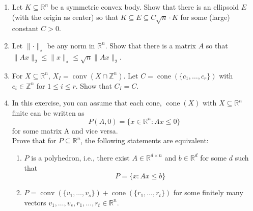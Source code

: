 \documentclass[11pt,a4paper]{article}
\renewcommand{\leq}{\leqslant}
\DeclareMathOperator{\conv}{conv}
\DeclareMathOperator{\cone}{cone}
\begin{document}
\begin{enumerate}
\item Let $K ⊆\mathbb{R}^n$ be a symmetric convex body. Show that there is an ellipsoid $E$ (with the origin as center) so that $K ⊆ E ⊆ C\sqrt{n}\cdot K$ for some (large) constant $C >0$.


\item Let $∥\cdot∥_∗$ be any norm in $\mathbb{R}^n$. Show that there is a matrix $A$ so that $∥Ax∥_2 \leq ∥x∥_∗ \leq \sqrt{n}∥Ax∥_2$.
\item For $X⊆\mathbb{R}^n$, $X_I=\conv(X∩\mathbb{Z}^n)$.
Let $C=\cone(\{c_1,\hdots,c_r\})$ with $c_i ∈ \mathbb{Z}^n$ for $1\leq i\leq r$. Show that $C_I =C$.

\item In this exercise, you can assume that each cone, $\cone(X)$ with $X ⊆ \mathbb{R}^n$ finite can be written as $$P(A,0)=\{x∈\mathbb{R}^n: Ax\leq 0\}$$ for some matrix A and vice versa. \\
Prove that for $P ⊆ \mathbb{R}^n$, the following statements are equivalent:
\begin{enumerate}
    \item $P$ is a polyhedron, i.e., there exist $A ∈ \mathbb{R}^{d×n}$ and $b ∈ \mathbb{R}^d$ for some $d$ such that
$$P =\{x:Ax\leq b\}$$
\item $P =\conv(\{v_1,\hdots,v_s\})+\cone(\{r_1,\hdots,r_t\})$ for some finitely many vectors $v_1, \hdots, v_s, r_1, \hdots, r_t \in \mathbb{R}^n$. 
\end{enumerate}

\end{enumerate}


%
%


 
\end{document}
